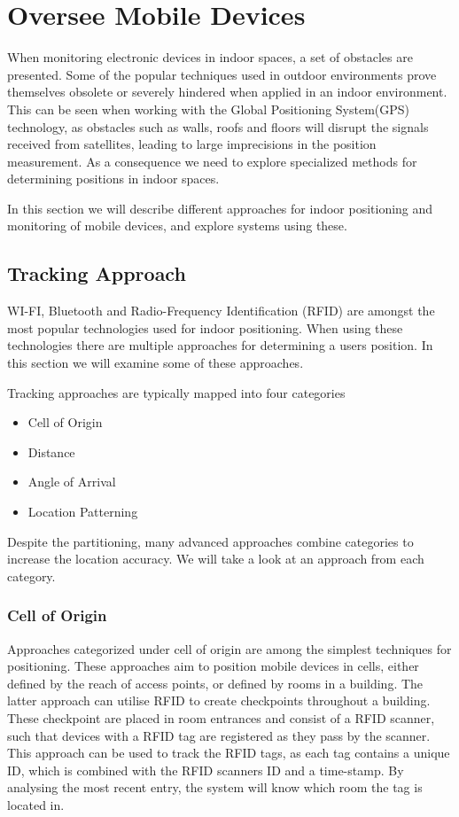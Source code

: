 \section{Oversee Mobile Devices}\label{sec:monitoring}
When monitoring electronic devices in indoor spaces, a set of obstacles are presented. Some of the popular techniques used in outdoor environments prove themselves obsolete or severely hindered when applied in an indoor environment. This can be seen when working with the Global Positioning System(GPS) technology, as obstacles such as walls, roofs and floors will disrupt the signals received from satellites, leading to large imprecisions in the position measurement\cite{gps_indoor}. As a consequence we need to explore specialized methods for determining positions in indoor spaces.

In this section we will describe different approaches for indoor positioning and monitoring of mobile devices, and explore systems using these.

\subsection{Tracking Approach}\label{sec:tracking_approach}
WI-FI, Bluetooth and Radio-Frequency Identification (RFID) are amongst the most popular technologies used for indoor positioning. When using these technologies there are multiple approaches for determining a users position. In this section we will examine some of these approaches.

Tracking approaches are typically mapped into four categories\cite{tracking_approaches}
\begin{itemize}
\item Cell of Origin
\item Distance
\item Angle of Arrival
\item Location Patterning
\end{itemize}
Despite the partitioning, many advanced approaches combine categories to increase the location accuracy. We will take a look at an approach from each category.

\subsubsection*{Cell of Origin}
Approaches categorized under cell of origin are among the simplest techniques for positioning. These approaches aim to position mobile devices in cells, either defined by the reach of access points, or defined by rooms in a building.
The latter approach can utilise RFID to create checkpoints throughout a building. These checkpoint are placed in room entrances and consist of a RFID scanner, such that devices with a RFID tag are registered as they pass by the scanner\cite{indoor_bin}. 
This approach can be used to track the RFID tags, as each tag contains a unique ID, which is combined with the RFID scanners ID and a time-stamp. By analysing the most recent entry, the system will know which room the tag is located in\cite{RFIDjournal}.

